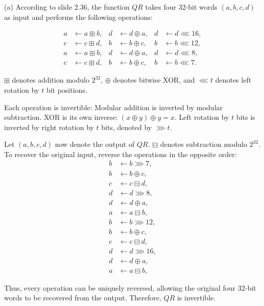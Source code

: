 \begin{loigiai}

(a) According to slide 2.36, the function $QR$ takes
four 32-bit words $(a,b,c,d)$ as input and performs the following
operations:

\begin{align*}
a &\leftarrow a \boxplus b, &
d &\leftarrow d \oplus a, &
d &\leftarrow d \lll 16,\\
c &\leftarrow c \boxplus d, &
b &\leftarrow b \oplus c, &
b &\leftarrow b \lll 12,\\
a &\leftarrow a \boxplus b, &
d &\leftarrow d \oplus a, &
d &\leftarrow d \lll 8,\\
c &\leftarrow c \boxplus d, &
b &\leftarrow b \oplus c, &
b &\leftarrow b \lll 7.
\end{align*}

$\boxplus$ denotes addition modulo $2^{32}$,
$\oplus$ denotes bitwise XOR, and $\lll t$ denotes left
rotation by $t$ bit positions.

Each operation is invertible: Modular addition is inverted by modular subtraction.
XOR is its own inverse: $(x\oplus y)\oplus y=x$. Left rotation by $t$ bits is inverted by right rotation by $t$ bits, denoted by $\ggg t$.

Let $(a,b,c,d)$ now denote the output of $QR$. $\boxminus$ denotes subtraction modulo $2^{32}$. To recover
the original input, reverse the operations in the opposite order:
\begin{align*}
b &\leftarrow b \ggg 7,\\
b &\leftarrow b \oplus c,\\
c &\leftarrow c \boxminus d,\\
d &\leftarrow d \ggg 8,\\
d &\leftarrow d \oplus a,\\
a &\leftarrow a \boxminus b,\\
b &\leftarrow b \ggg 12,\\
b &\leftarrow b \oplus c,\\
c &\leftarrow c \boxminus d,\\
d &\leftarrow d \ggg 16,\\
d &\leftarrow d \oplus a,\\
a &\leftarrow a \boxminus b,
\end{align*}


Thus, every operation can be uniquely reversed, allowing the
original four 32-bit words to be recovered from the output.
Therefore, $QR$ is invertible.


\end{loigiai}
